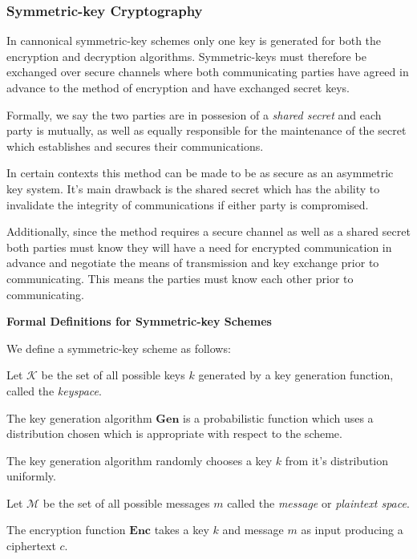 \subsubsection*{Symmetric-key Cryptography} 

In cannonical symmetric-key schemes only one key is generated for both the encryption and decryption algorithms. Symmetric-keys must therefore be exchanged over secure channels where both communicating parties have agreed in advance to the method of encryption and have exchanged secret keys. 


Formally, we say the two parties are in possesion of a \textit{shared secret} and each party is mutually, as well as equally responsible for the maintenance of the secret which establishes and secures their communications. 

 In certain contexts this method can be made to be as secure as an asymmetric key system. It's main drawback is the shared secret which has the ability to invalidate the integrity of communications if either party is compromised.


Additionally, since the method requires a secure channel as well as a shared secret both parties must know they will have a need for encrypted communication in advance and negotiate the means of transmission and key exchange prior to communicating. This means the parties must know each other prior to communicating. 



\textbf{Formal Definitions for Symmetric-key Schemes}


We define a symmetric-key scheme as follows:


Let $\mathbf{\mathcal{K}}$ be the set of all possible keys $k$  generated by a key generation function, called the \textit{keyspace}.

The key generation algorithm $\mathbf{Gen}$ is a probabilistic function which uses a distribution chosen which is appropriate with respect to the scheme.

The key generation algorithm randomly chooses a key $k$ from it's distribution uniformly. 


Let $\mathbf{\mathcal{M}}$ be the set of all possible messages $m$ called the \textit{message} or \textit{{plaintext space}}.


The encryption function $\mathbf{{Enc}}$ takes a key $k$ and message $m$ as input producing a ciphertext $c$.


